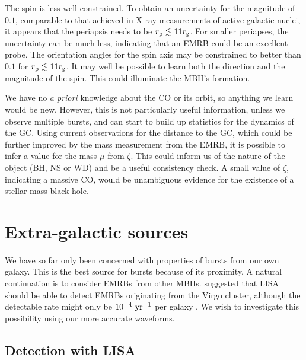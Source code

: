 The spin is less well constrained. To obtain an uncertainty for the magnitude of $0.1$, comparable to that achieved in X-ray measurements of active galactic nuclei, it appears that the periapsis needs to be $r_\mathrm{p} \lesssim 11 r_\mathrm{g}$. For smaller periapses, the uncertainty can be much less, indicating that an EMRB could be an excellent probe. The orientation angles for the spin axis may be constrained to better than $0.1$ for $r_\mathrm{p} \lesssim 11 r_\mathrm{g}$. It may well be possible to learn both the direction and the magnitude of the spin. This could illuminate the MBH's formation.

We have no {\it a priori} knowledge about the CO or its orbit, so anything we learn would be new. However, this is not particularly useful information, unless we observe multiple bursts, and can start to build up statistics for the dynamics of the GC. Using current observations for the distance to the GC, which could be further improved by the mass measurement from the EMRB, it is possible to infer a value for the mass $\mu$ from $\zeta$. This could inform us of the nature of the object (BH, NS or WD) and be a useful consistency check. A small value of $\zeta$, indicating a massive CO, would be unambiguous evidence for the existence of a stellar mass black hole.

\section{Extra-galactic sources}\label{sec:Extragal}

We have so far only been concerned with properties of bursts from our own galaxy. This is the best source for bursts because of its proximity. A natural continuation is to consider EMRBs from other MBHs. \citet{Rubbo2006} suggested that LISA should be able to detect EMRBs originating from the Virgo cluster, although the detectable rate might only be $10^{-4}~\mathrm{yr^{-1}}$ per galaxy \citep{Hopman2007}. We wish to investigate this possibility using our more accurate waveforms.

\subsection{Detection with LISA}

